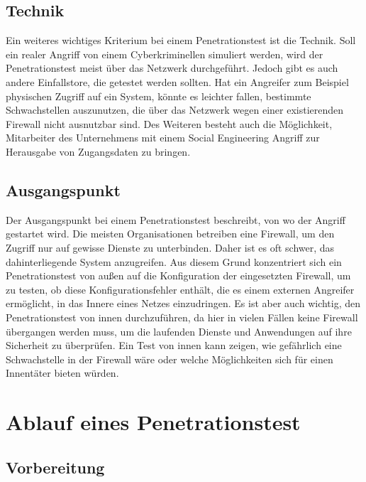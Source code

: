 \subsection{Technik}
Ein weiteres wichtiges Kriterium bei einem Penetrationstest ist die Technik. Soll ein realer Angriff von einem
Cyberkriminellen simuliert werden, wird der Penetrationstest meist über das Netzwerk durchgeführt. Jedoch
gibt es auch andere Einfallstore, die getestet werden sollten. Hat ein Angreifer zum Beispiel physischen Zugriff
auf ein System, könnte es leichter fallen, bestimmte Schwachstellen auszunutzen, die über das Netzwerk wegen einer existierenden Firewall nicht ausnutzbar sind. Des Weiteren besteht auch die Möglichkeit, Mitarbeiter des
Unternehmens mit einem Social Engineering Angriff zur Herausgabe von Zugangsdaten zu bringen\cite[15-16]{pt03bsi}.

\subsection{Ausgangspunkt}
Der Ausgangspunkt bei einem Penetrationstest beschreibt, von wo der Angriff gestartet wird. Die meisten
Organisationen betreiben eine Firewall, um den Zugriff nur auf gewisse Dienste zu unterbinden. Daher ist es oft
schwer, das dahinterliegende System anzugreifen. Aus diesem Grund konzentriert sich ein Penetrationstest von
außen auf die Konfiguration der eingesetzten Firewall, um zu testen, ob diese Konfigurationsfehler enthält, die
es einem externen Angreifer ermöglicht, in das Innere eines Netzes einzudringen. Es ist aber auch wichtig, den
Penetrationstest von innen durchzuführen, da hier in vielen Fällen keine Firewall übergangen werden muss, um
die laufenden Dienste und Anwendungen auf ihre Sicherheit zu überprüfen. Ein Test von innen kann zeigen,
wie gefährlich eine Schwachstelle in der Firewall wäre oder welche Möglichkeiten sich für einen Innentäter
bieten würden\cite[16-17]{pt03bsi}.

\section{Ablauf eines Penetrationstest}

\subsection{Vorbereitung}


